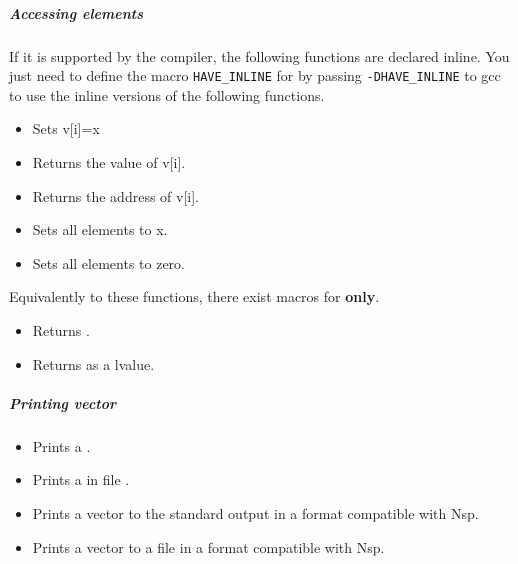 \subparagraph{Accessing elements}

If it is supported by the compiler, the following functions are declared
inline. You just need to define the macro \verb!HAVE_INLINE! for by passing
\verb!-DHAVE_INLINE! to gcc to use the inline versions of the following
functions.
\begin{itemize}
\item {}
  \sshortdescribe Sets v[i]=x  
\item {}
  \sshortdescribe Returns the value of v[i].  
\item {}
  \sshortdescribe Returns the address of v[i].  
\item {}
  \sshortdescribe Sets all elements to x.  
\item {}
  \sshortdescribe Sets all elements to zero.  
\end{itemize}
Equivalently to these functions, there exist macros for {\bf {} only}.
\begin{itemize}
\item {}
  \sshortdescribe Returns .
  
\item {}
  \sshortdescribe Returns  as a lvalue.
\end{itemize}


\subparagraph{Printing vector}
\begin{itemize}
\item {}
  \sshortdescribe Prints a .  
\item {}
  \sshortdescribe Prints a  in file .  
\item {}
  \sshortdescribe Prints a vector to the standard output in a format
  compatible with Nsp.  

\item {}
  \sshortdescribe Prints a vector to a file in a format compatible with Nsp.
\end{itemize}

